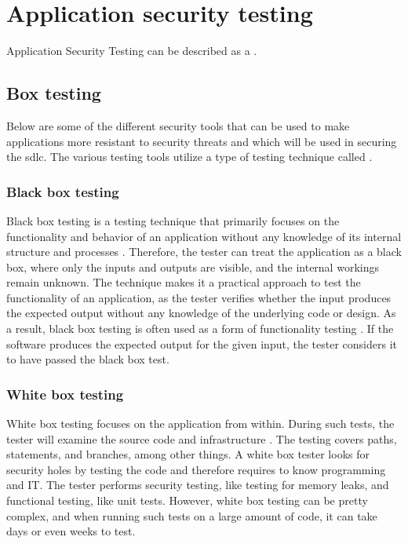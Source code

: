 \section{Application security testing}
Application Security Testing can be described as a \textit{} \cite{AST}.

\subsection{Box testing}
\label{boxtesting}
Below are some of the different security tools that can be used to make applications more resistant to security threats and which will be used in securing the \acrshort{sdlc}. 
The various testing tools utilize a type of testing technique called .

\subsubsection{Black box testing}
\label{BlackBoxTesting}
Black box testing is a testing technique that primarily focuses on the functionality and behavior of an application without any knowledge of its internal structure and processes  \cite{blackbox}. Therefore, the tester can treat the application as a black box, where only the inputs and outputs are visible, and the internal workings remain unknown. The technique makes it a practical approach to test the functionality of an application, as the tester verifies whether the input produces the expected output without any knowledge of the underlying code or design. As a result, black box testing is often used as a form of functionality testing \cite{BlackBoxTestingFunctional}. If the software produces the expected output for the given input, the tester considers it to have passed the black box test.

\subsubsection{White box testing}
White box testing focuses on the application from within. During such tests, the tester will examine the source code and infrastructure \cite{whitebox}. The testing covers paths, statements, and branches, among other things. A white box tester looks for security holes by testing the code and therefore requires to know programming and IT. The tester performs security testing, like testing for memory leaks, and functional testing, like unit tests. However, white box testing can be pretty complex, and when running such tests on a large amount of code, it can take days or even weeks to test. 


